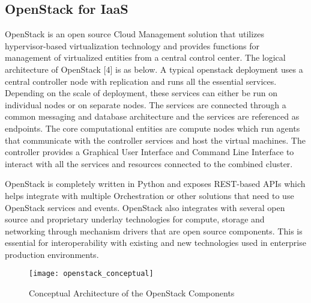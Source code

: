 \subsection{OpenStack for IaaS}

OpenStack is an open source Cloud Management solution that utilizes hypervisor-based virtualization technology and provides functions for management of virtualized entities from a central control center. The logical architecture of OpenStack [4] is as below. A typical openstack deployment uses a central controller node with replication and runs all the essential services. Depending on the scale of deployment, these services can either be run on individual nodes or on separate nodes. The services are connected through a common messaging and database architecture and the services are referenced as endpoints. The core computational entities are compute nodes which run agents that communicate with the controller services and host the virtual machines. The controller provides a Graphical User Interface and Command Line Interface to interact with all the services and resources connected to the combined cluster. 

OpenStack is completely written in Python and exposes REST-based APIs which helps integrate with multiple Orchestration or other solutions that need to use OpenStack services and events. OpenStack also integrates with several open source and proprietary underlay technologies for compute, storage and networking through mechanism drivers that are open source components. This is essential for interoperability with existing and new technologies used in enterprise production environments.

\begin{figure}[h!]
    \centering
    \texttt{[image: openstack\_conceptual]}
    \label{fig:figure11}
    \caption{Conceptual Architecture of the OpenStack Components \protect\cite{openstack}}
\end{figure}

